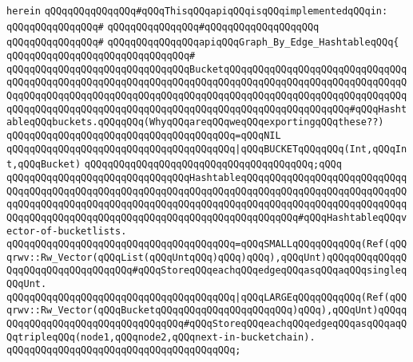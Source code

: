 \verb|herein|\newline
\newline
\verb|qQQqqQQqqQQqqQQq#qQQqThisqQQqapiqQQqisqQQqimplementedqQQqin:|\newline
\verb|qQQqqQQqqQQqqQQq#|\newline
\verb|qQQqqQQqqQQqqQQq#qQQqqQQqqQQqqQQqqQQq|\newline
\verb|qQQqqQQqqQQqqQQq#|\newline
\verb|qQQqqQQqqQQqqQQqapiqQQqGraph_By_Edge_HashtableqQQq{|\newline
\verb|qQQqqQQqqQQqqQQqqQQqqQQqqQQqqQQq#|\newline
\verb|qQQqqQQqqQQqqQQqqQQqqQQqqQQqqQQqBucketqQQqqQQqqQQqqQQqqQQqqQQqqQQqqQQqqQQqqQQqqQQqqQQqqQQqqQQqqQQqqQQqqQQqqQQqqQQqqQQqqQQqqQQqqQQqqQQqqQQqqQQqqQQqqQQqqQQqqQQqqQQqqQQqqQQqqQQqqQQqqQQqqQQqqQQqqQQqqQQqqQQqqQQqqQQqqQQqqQQqqQQqqQQqqQQqqQQqqQQqqQQqqQQqqQQqqQQqqQQqqQQqqQQqqQQq#qQQqHashtableqQQqbuckets.qQQqqQQq(WhyqQQqareqQQqweqQQqexportingqQQqthese??)|\newline
\verb|qQQqqQQqqQQqqQQqqQQqqQQqqQQqqQQqqQQqqQQq=qQQqNIL|\newline
\verb|qQQqqQQqqQQqqQQqqQQqqQQqqQQqqQQqqQQqqQQq|\verb#|qQQqBUCKETqQQqqQQq(Int,qQQqInt,qQQqBucket)#\newline
\verb|qQQqqQQqqQQqqQQqqQQqqQQqqQQqqQQqqQQqqQQq;qQQq|\newline
\newline
\verb|qQQqqQQqqQQqqQQqqQQqqQQqqQQqqQQqHashtableqQQqqQQqqQQqqQQqqQQqqQQqqQQqqQQqqQQqqQQqqQQqqQQqqQQqqQQqqQQqqQQqqQQqqQQqqQQqqQQqqQQqqQQqqQQqqQQqqQQqqQQqqQQqqQQqqQQqqQQqqQQqqQQqqQQqqQQqqQQqqQQqqQQqqQQqqQQqqQQqqQQqqQQqqQQqqQQqqQQqqQQqqQQqqQQqqQQqqQQqqQQqqQQqqQQqqQQqqQQq#qQQqHashtableqQQqvector-of-bucketlists.|\newline
\verb|qQQqqQQqqQQqqQQqqQQqqQQqqQQqqQQqqQQqqQQq=qQQqSMALLqQQqqQQqqQQq(Ref(qQQqrwv::Rw_Vector(qQQqList(qQQqUntqQQq)qQQq)qQQq),qQQqUnt)qQQqqQQqqQQqqQQqqQQqqQQqqQQqqQQqqQQq#qQQqStoreqQQqeachqQQqedgeqQQqasqQQqaqQQqsingleqQQqUnt.|\newline
\verb|qQQqqQQqqQQqqQQqqQQqqQQqqQQqqQQqqQQqqQQq|\verb#|qQQqLARGEqQQqqQQqqQQq(Ref(qQQqrwv::Rw_Vector(qQQqBucketqQQqqQQqqQQqqQQqqQQqqQQq)qQQq),qQQqUnt)qQQqqQQqqQQqqQQqqQQqqQQqqQQqqQQqqQQq#\verb|#qQQqStoreqQQqeachqQQqedgeqQQqasqQQqaqQQqtripleqQQq(node1,qQQqnode2,qQQqnext-in-bucketchain).|\newline
\verb|qQQqqQQqqQQqqQQqqQQqqQQqqQQqqQQqqQQqqQQq;|\newline

